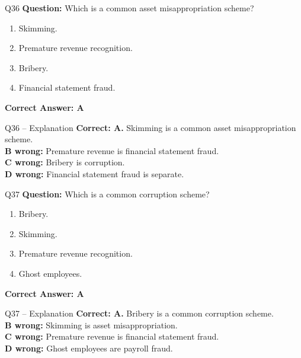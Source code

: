 \documentclass[aspectratio=169,10pt]{beamer}
\begin{document}
	\begin{frame}[t]{Q36}
		\small
		\textbf{Question:} Which is a common asset misappropriation scheme?
		\begin{enumerate}[label=\Alph*.,itemsep=1pt,topsep=2pt]
			\item Skimming.
			\item Premature revenue recognition.
			\item Bribery.
			\item Financial statement fraud.
		\end{enumerate}
		\vspace{4pt}
		\textbf{Correct Answer: A}
	\end{frame}
	
	\begin{frame}[t]{Q36 -- Explanation}
		\small
		\textbf{Correct: A.} Skimming is a common asset misappropriation scheme. \\[4pt]
		\textbf{B wrong:} Premature revenue is financial statement fraud. \\[2pt]
		\textbf{C wrong:} Bribery is corruption. \\[2pt]
		\textbf{D wrong:} Financial statement fraud is separate.
	\end{frame}
	
	\begin{frame}[t]{Q37}
		\small
		\textbf{Question:} Which is a common corruption scheme?
		\begin{enumerate}[label=\Alph*.,itemsep=1pt,topsep=2pt]
			\item Bribery.
			\item Skimming.
			\item Premature revenue recognition.
			\item Ghost employees.
		\end{enumerate}
		\vspace{4pt}
		\textbf{Correct Answer: A}
	\end{frame}
	
	\begin{frame}[t]{Q37 -- Explanation}
		\small
		\textbf{Correct: A.} Bribery is a common corruption scheme. \\[4pt]
		\textbf{B wrong:} Skimming is asset misappropriation. \\[2pt]
		\textbf{C wrong:} Premature revenue is financial statement fraud. \\[2pt]
		\textbf{D wrong:} Ghost employees are payroll fraud.
	\end{frame}
	
\end{document}
